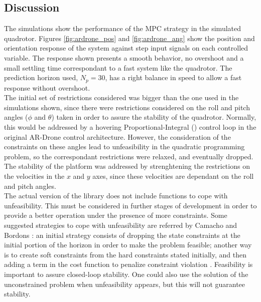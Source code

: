 \subsection{Discussion}

The simulations show the performance of the MPC strategy in the simulated quadrotor. Figures \ref{fig:ardrone_pos} and \ref{fig:ardrone_ang} show the position and orientation  response of the system against step input signals on each controlled variable. The response shown presents a smooth behavior, no overshoot and a small settling time correspondant to a fast system like the quadrotor. The prediction horizon used, $N_p = 30$, has a right balance in speed to allow a fast response without overshoot.\\

The initial set of restrictions considered was bigger than the one used in the simulations shown, since there were restrictions considered on the roll and pitch angles ($\phi$ and $\theta$) taken in order to assure the stability of the quadrotor. Normally, this would be addressed by a hovering Proportional-Integral () control loop in the original AR-Drone control architecture. However, the consideration of the constraints on these angles lead to unfeasibility in the quadratic programming problem, so  the correspondant restrictions were relaxed, and eventually dropped. The stability of the platform was addressed by strenghtening the restrictions on the velocities in the $x$ and $y$ axes, since these velocities are dependant on the roll and pitch angles. \\

The actual version of the library does not include functions to cope with unfeasibility. This must be considered in further stages of development in order to provide a better operation under the presence of more constraints. Some suggested strategies to cope with unfeasibility are referred by Camacho and Bordons \cite{CamachoBordons}: an initial strategy consists of dropping the state constraints at the initial portion of the horizon in order to make the problem feasible; another way is to create soft constraints from the hard constraints stated initially, and then adding a term in the cost function to penalize constraint violation \cite{Molero2011}. Feasibility is important to assure closed-loop stability. One could also use the solution of the unconstrained problem  when unfeasibility appears, but this will not guarantee stability. \\

